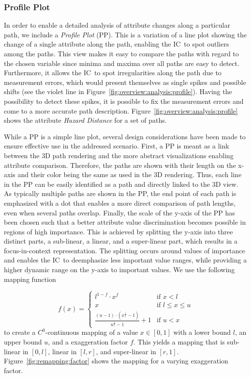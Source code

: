 \documentclass[review,journal]{vgtc}         %
\def\IC{IC}
\begin{document}
\subsubsection{Profile Plot} \label{sec:overview:analysis:profile}
In order to enable a detailed analysis of attribute changes along a particular path, we include a \emph{Profile Plot} (PP). This is a variation of a line plot showing the change of a single attribute along the path, enabling the \IC\ to spot outliers among the paths. This view makes it easy to compare the paths with regard to the chosen variable since minima and maxima over all paths are easy to detect. Furthermore, it allows the \IC\ to spot irregularities along the path due to measurement errors, which would present themselves as single spikes and possible shifts (see the violet line in Figure~\ref{fig:overview:analysis:profile}). Having the possibility to detect these spikes, it is possible to fix the measurement errors and come to a more accurate path description. Figure~\ref{fig:overview:analysis:profile} shows the attribute \emph{Hazard Distance} for a set of paths.

While a PP is a simple line plot, several design considerations have been made to ensure effective use in the addressed scenario. First, a PP is meant as a link between the 3D path rendering and the more abstract visualizations enabling attribute comparison. Therefore, the paths are shown with their length on the x-axis and their color being the same as used in the 3D rendering. Thus, each line in the PP can be easily identified as a path and directly linked to the 3D view. As typically multiple paths are shown in the PP, the end point of each path is emphasized with a dot that enables a more direct comparison of path lengths, even when several paths overlap. Finally, the scale of the y-axis of the PP has been chosen such that a better attribute value discrimination becomes possible in regions of high importance. This is achieved by splitting the y-axis into three distinct parts, a sub-linear, a linear, and a super-linear part, which results in a focus-in-context representation. The splitting occurs around values of importance and enables the \IC\ to deemphasize less important value ranges, while providing a higher dynamic range on the y-axis to important values. We use the following mapping function

$$
f(x) = \left\{
    \begin{array}{ll}  
    l^{1-f} \cdot x^f & \textrm{if } x < l \\
    x & \textrm{if } l \leq x \leq u \\
    \frac{(u-1) \cdot \left( x^\frac{1}{f} - 1\right)}{u^\frac{1}{f} - 1} + 1 & \textrm{if } u < x
    \end{array}
    \right.
$$
to create a $C^0$-continuous mapping of a value $x \in [0,1]$ with a lower bound $l$, an upper bound $u$, and a exaggeration factor $f$. This yields a mapping that is sub-linear in $[0,l]$, linear in $[l,r]$, and super-linear in $[r,1]$. Figure~\ref{fig:remapping:factor} shows the mapping for a varying exaggeration factor.
\end{document}
